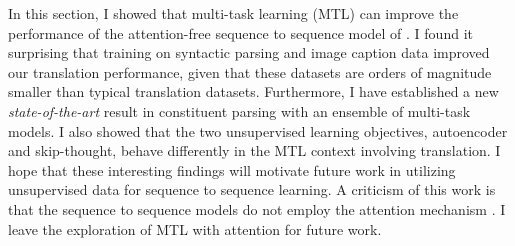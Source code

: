 
In this section, I showed that multi-task learning (MTL) can improve the
performance of the attention-free sequence to sequence model of
\citep{sutskever14}.  I found it surprising that training on syntactic
parsing and image caption data improved our translation performance, given
that these 
datasets are orders of magnitude smaller than typical translation
datasets. 
Furthermore, I have established a new {\it state-of-the-art} result in
constituent parsing with an ensemble of multi-task models.
I also showed that the two unsupervised
learning objectives, autoencoder and skip-thought, behave differently in the MTL context
involving translation. I hope that these interesting
findings will motivate future work in utilizing unsupervised data for sequence
to sequence learning.
A criticism of this work is that the sequence to sequence models do not employ
the attention mechanism \citep{bog15}.  I leave the exploration
of MTL with attention for future work.



